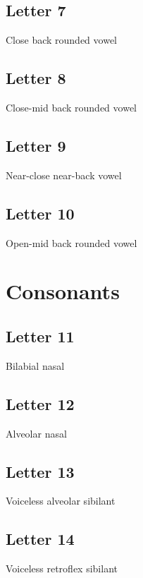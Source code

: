 \documentclass{book}
\newcommand{\display}[1]{\begin{center}\resizebox{2cm}{!}{\texttt{[image: \#1]}}\end{center}}
\begin{document}
\display{letters/vowels/6.JPG}


\section{Letter 7}
Close back rounded vowel

\display{letters/vowels/7.JPG}


\section{Letter 8}
Close-mid back rounded vowel

\display{letters/vowels/8.JPG}


\section{Letter 9}
Near-close near-back vowel

\display{letters/vowels/9.JPG}


\section{Letter 10}
Open-mid back rounded vowel

\display{letters/vowels/10.JPG}



\chapter{Consonants}
\section{Letter 11}
Bilabial nasal

\display{letters/consonants/11.JPG}


\section{Letter 12}
Alveolar nasal

\display{letters/consonants/12.JPG}


\section{Letter 13}
Voiceless alveolar sibilant

\display{letters/consonants/13.JPG}


\section{Letter 14}
Voiceless retroflex sibilant
\end{document}
